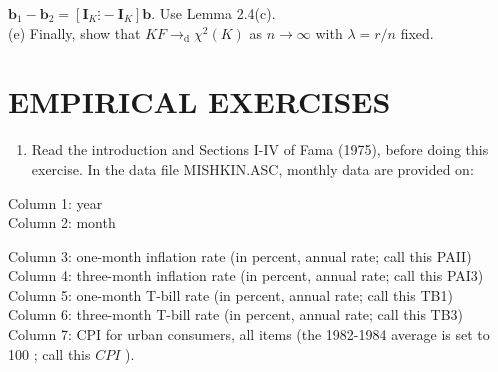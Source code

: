 \documentclass[10pt]{article}
\begin{document}
$\mathbf{b}_{1}-\mathbf{b}_{2}=\left[\mathbf{I}_{K} \vdots-\mathbf{I}_{K}\right] \mathbf{b}$. Use Lemma 2.4(c).\\
(e) Finally, show that $K F \rightarrow_{\mathrm{d}} \chi^{2}(K)$ as $n \rightarrow \infty$ with $\lambda=r / n$ fixed.

\section*{EMPIRICAL EXERCISES}
\begin{enumerate}
  \item Read the introduction and Sections I-IV of Fama (1975), before doing this exercise. In the data file MISHKIN.ASC, monthly data are provided on:
\end{enumerate}

Column 1: year\\
Column 2: month

Column 3: one-month inflation rate (in percent, annual rate; call this PAII)\\
Column 4: three-month inflation rate (in percent, annual rate; call this PAI3)\\
Column 5: one-month T-bill rate (in percent, annual rate; call this TB1)\\
Column 6: three-month T-bill rate (in percent, annual rate; call this TB3)\\
Column 7: CPI for urban consumers, all items (the 1982-1984 average is set to 100 ; call this $C P I$ ).
\end{document}
